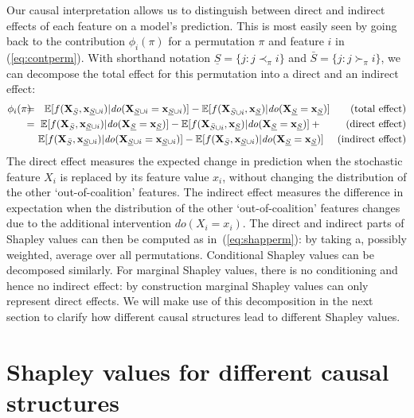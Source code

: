\documentclass{article}
\newcommand{\vX}{\mathbf{X}}
\newcommand{\vx}{\mathbf{x}}
\newcommand{\expectation}{\mathbb{E}}
\newcommand{\contribution}{{\phi}}
\newcommand{\dodo}{\mathit{do}}
\newcommand{\ldo}[1]{\dodo(X_{#1} = x_{#1})}
\newcommand{\lvdo}[1]{\dodo(\vX_{#1} = \vx_{#1})}
\newcommand{\perm}{\pi}
\newcommand{\isequal}{\hspace*{-2.5mm} & = & \hspace*{-2.5mm}}
\newcommand{\Spre}{\underline{S}}
\newcommand{\Spost}{\bar{S}}
\begin{document}
Our causal interpretation allows us to distinguish between direct and indirect effects of each feature on a model's prediction. This is most easily seen by going back to the contribution $\contribution_i(\perm)$ for a permutation $\perm$ and feature $i$ in (\ref{eq:contperm}). With shorthand notation $\Spre = \{j: j \prec_\perm i\}$ and $\Spost = \{j: j \succ_\perm i\}$, we can decompose the total effect for this permutation into a direct and an indirect effect:
\begin{eqnarray*}
	\contribution_i(\perm) \isequal
	\expectation[f(\vX_{\Spost},\vx_{\Spre \cup i})|\lvdo{\Spre \cup i}] - \expectation[f(\vX_{\Spost \cup i},\vx_{\Spre})|\lvdo{\Spre}] ~~~~~~\mbox{(total effect)} \\
	\isequal \expectation[f(\vX_{\Spost},\vx_{\Spre \cup i})|\lvdo{\Spre}] - \expectation[f(\vX_{\Spost \cup i},\vx_{\Spre})|\lvdo{\Spre}] + ~~~~~~~\mbox{(direct effect)} \\
	&& \! \! \! \! \expectation[f(\vX_{\Spost},\vx_{\Spre \cup i})|\lvdo{\Spre \cup i}] - \expectation[f(\vX_{\Spost},\vx_{\Spre \cup i})|\lvdo{\Spre}] ~~~~\mbox{(indirect effect)}
\end{eqnarray*}
The direct effect measures the expected change in prediction when the stochastic feature $X_i$ is replaced by its feature value $x_i$, without changing the distribution of the other `out-of-coalition' features. The indirect effect measures the difference in expectation when the distribution of the other `out-of-coalition' features changes due to the additional intervention $\ldo{i}$. The direct and indirect parts of Shapley values can then be computed as in~(\ref{eq:shapperm}): by taking a, possibly weighted, average over all permutations. Conditional Shapley values can be decomposed similarly. For marginal Shapley values, there is no conditioning and hence no indirect effect: by construction marginal Shapley values can only represent direct effects. We will make use of this decomposition in the next section to clarify how different causal structures lead to different Shapley values.

\section{Shapley values for different causal structures}
\label{sec:toymodels}

\newcommand{\patd}{{\em D}}
\newcommand{\pats}{{\em E}}
\newcommand{\pata}{{\em R}}
\end{document}
